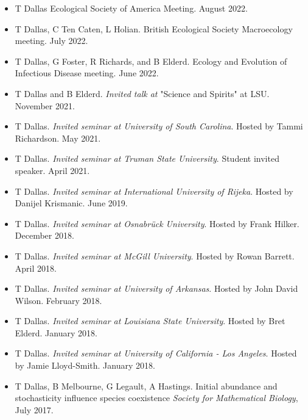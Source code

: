 \documentclass[]{CV}
\begin{document}
\begin{itemize}

\item {\mefont T Dallas} Ecological Society of America Meeting. August 2022.

\item {\mefont T Dallas}, C Ten Caten, L Holian. British Ecological Society Macroecology meeting. July 2022.

\item {\mefont T Dallas}, G Foster, R Richards, and B Elderd. Ecology and Evolution of Infectious Disease meeting. June 2022.  

\item {\mefont T Dallas} and B Elderd. \textit{Invited talk at} "Science and Spirits" at LSU. November 2021. 

\item {\mefont T Dallas}. \textit{Invited seminar at University of South Carolina}. Hosted by Tammi Richardson. May 2021. 

\item {\mefont T Dallas}. \textit{Invited seminar at Truman State University}. Student invited speaker. April 2021. 

\item {\mefont T Dallas}. \textit{Invited seminar at International University of Rijeka}. Hosted by Danijel Krismanic. June 2019.

\item {\mefont T Dallas}. \textit{Invited seminar at Osnabr\"uck University}. Hosted by Frank Hilker. December 2018.

\item {\mefont T Dallas}. \textit{Invited seminar at McGill University}. Hosted by Rowan Barrett. April 2018. 

\item {\mefont T Dallas}. \textit{Invited seminar at University of Arkansas}. Hosted by John David Wilson. February 2018. 

\item {\mefont T Dallas}. \textit{Invited seminar at Louisiana State University}. Hosted by Bret Elderd. January 2018. 

\item {\mefont T Dallas}. \textit{Invited seminar at University of California - Los Angeles}. Hosted by Jamie Lloyd-Smith. January 2018. 

\item {\mefont T Dallas}, B Melbourne, G Legault, A Hastings. Initial abundance and stochasticity influence species coexistence \textit{Society for Mathematical Biology}, July 2017.


\end{itemize}
\end{document}
